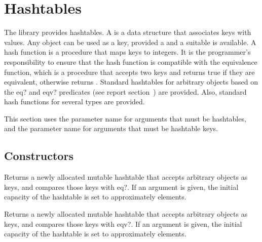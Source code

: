 \chapter{Hashtables}
\label{hashtablechapter}

The  library provides hashtables.
A  is a data structure that associates keys with values.
Any object can be used as a key, provided a 
and a suitable  is available.  A hash function is a
procedure that maps
keys to integers.
It is the programmer's responsibility to ensure that the hash function
is compatible with the equivalence function,
which is a procedure that accepts two keys and returns true if they
are equivalent, otherwise returns \schfalse{}.
Standard hashtables for arbitrary objects based on the {\cf eq?} and 
{\cf eqv?} predicates (see report section~) are provided.  
Also, standard hash functions for several types are provided.

This section uses the  parameter name for arguments
that must be hashtables, and the  parameter name for
arguments that must be hashtable keys.

\section{Constructors}


\begin{entry}{%
}

Returns a newly allocated mutable hashtable that accepts
arbitrary objects as keys,
and compares those keys with {\cf eq?}. If an argument is given, the initial 
capacity of the hashtable is set to approximately  elements.

\end{entry}

\begin{entry}{%
}

Returns a newly allocated mutable hashtable that accepts
arbitrary objects as keys,
and compares those keys with {\cf eqv?}.
If an argument is given, the initial 
capacity of the hashtable is set to approximately  elements.

\end{entry}

